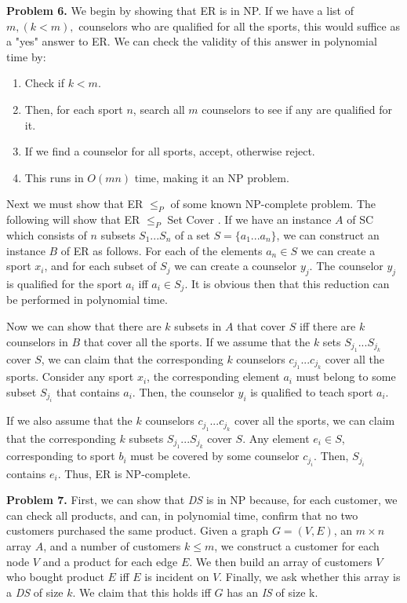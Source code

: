 \documentclass{article}
\begin{document}
\hfill

\textbf{Problem 6.} We begin by showing that ER is in NP. If we have a list of $m, (k < m),$ counselors who are qualified for all the sports, this would suffice as a "yes" answer to ER. We can check the validity of this answer in polynomial time by:

\begin{enumerate}
    \item Check if $k < m$.
    \item Then, for each sport $n$, search all $m$ counselors to see if any are qualified for it.
    \item If we find a counselor for all sports, accept, otherwise reject.
    \item This runs in $O(mn)$ time, making it an NP problem.
\end{enumerate}

Next we must show that ER $\leq_P$ of some known NP-complete problem. The following will show that ER $\leq_P$ Set Cover \cite{website:6} \cite{website:7}. If we have an instance $A$ of SC which consists of $n$ subsets $S_1...S_n$ of a set $S = \{ a_1...a_n \}$, we can construct an instance $B$ of ER as follows. For each of the elements $a_n \in S$ we can create a sport $x_i$, and for each subset of $S_j$ we can create a counselor $y_j$. The counselor $y_j$ is qualified for the sport $a_i$ iff $a_i \in S_j$. It is obvious then that this reduction can be performed in polynomial time.

\hfill

Now we can show that there are $k$ subsets in $A$ that cover $S$ iff there are $k$ counselors in $B$ that cover all the sports. If we assume that the $k$ sets $S_{j_1}...S_{j_k}$ cover $S$, we can claim that the corresponding $k$ counselors $c_{j_1}...c_{j_k}$ cover all the sports. Consider any sport $x_i$, the corresponding element $a_i$ must belong to some subset $S_{j_i}$ that contains $a_i$. Then, the counselor $y_i$ is qualified to teach sport $a_i$. 

\hfill

If we also assume that the $k$ counselors $c_{j_1}...c_{j_k}$ cover all the sports, we can claim that the corresponding $k$ subsets $S_{j_1}...S_{j_k}$ cover $S$. Any element $e_i \in S$, corresponding to sport $b_i$ must be covered by some counselor $c_{j_i}$. Then, $S_{j_i}$ contains $e_i$. Thus, ER is NP-complete.

\hfill

\textbf{Problem 7.} First, we can show that \emph{DS} is in NP because, for each customer, we can check all products, and can, in polynomial time, confirm that no two customers purchased the same product. Given a graph $G = (V, E)$, an $m \times n$ array $A$, and a number of customers $k \leq m$, we construct a customer for each node $V$ and a product for each edge $E$. We then build an array of customers $V$ who bought product $E$ iff $E$ is incident on $V$. Finally, we ask whether this array is a \emph{DS} of size $k$. We claim that this holds iff $G$ has an \emph{IS} of size k.
\end{document}

